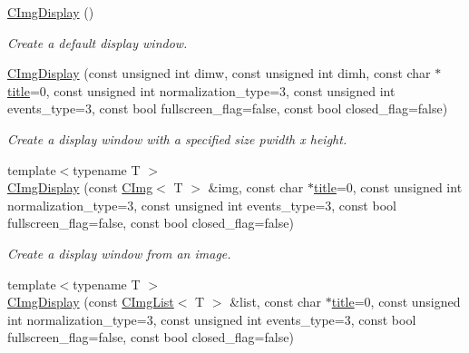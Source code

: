 \begin{DoxyCompactItemize}
\item 
\hyperlink{structcimg__library_1_1_c_img_display_acc67139c6af7ecc3e6eb4964a6b3a07f}{CImgDisplay} ()
\begin{DoxyCompactList}\small\item\em Create a default display window. \item\end{DoxyCompactList}\item 
\hyperlink{structcimg__library_1_1_c_img_display_a9fafef6af9930b63632aa41de46ef712}{CImgDisplay} (const unsigned int dimw, const unsigned int dimh, const char $\ast$\hyperlink{structcimg__library_1_1_c_img_display_afa41a285232ef89035e1832c7dc92ec1}{title}=0, const unsigned int normalization\_\-type=3, const unsigned int events\_\-type=3, const bool fullscreen\_\-flag=false, const bool closed\_\-flag=false)
\begin{DoxyCompactList}\small\item\em Create a display window with a specified size {\ttfamily pwidth} x {\ttfamily height}. \item\end{DoxyCompactList}\item 
{\footnotesize template$<$typename T $>$ }\\\hyperlink{structcimg__library_1_1_c_img_display_a5f31e0f7bab904a7a7da876e5305b100}{CImgDisplay} (const \hyperlink{structcimg__library_1_1_c_img}{CImg}$<$ T $>$ \&img, const char $\ast$\hyperlink{structcimg__library_1_1_c_img_display_afa41a285232ef89035e1832c7dc92ec1}{title}=0, const unsigned int normalization\_\-type=3, const unsigned int events\_\-type=3, const bool fullscreen\_\-flag=false, const bool closed\_\-flag=false)
\begin{DoxyCompactList}\small\item\em Create a display window from an image. \item\end{DoxyCompactList}\item 
{\footnotesize template$<$typename T $>$ }\\\hyperlink{structcimg__library_1_1_c_img_display_a6ff8481d2bf9cc0d53dd23f8eae68e26}{CImgDisplay} (const \hyperlink{structcimg__library_1_1_c_img_list}{CImgList}$<$ T $>$ \&list, const char $\ast$\hyperlink{structcimg__library_1_1_c_img_display_afa41a285232ef89035e1832c7dc92ec1}{title}=0, const unsigned int normalization\_\-type=3, const unsigned int events\_\-type=3, const bool fullscreen\_\-flag=false, const bool closed\_\-flag=false)

\end{DoxyCompactItemize}
